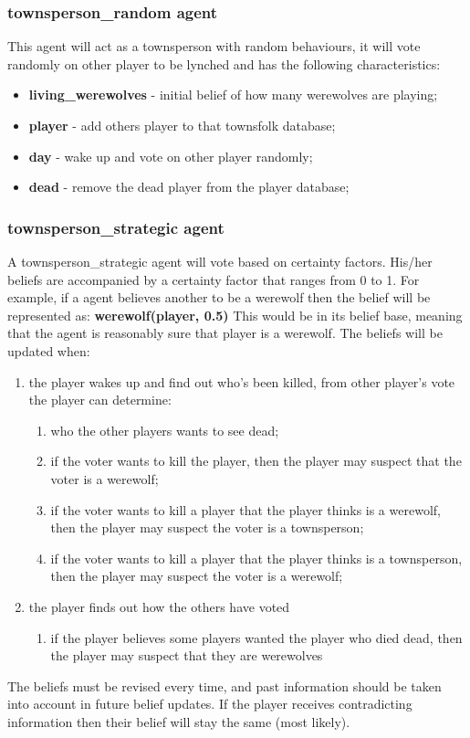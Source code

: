 \documentclass{article}
\begin{document}
\subsubsection{townsperson\_random agent}
This agent will act as a townsperson with random behaviours, it will vote randomly on other player to be lynched and has the following characteristics:
\begin{itemize}
	\item \textbf{living\_werewolves} - initial belief of how many werewolves are playing; 
	\item \textbf{player} - add others player to that townsfolk database;
	\item \textbf{day} - wake up and vote on other player randomly;
	\item \textbf{dead} - remove the dead player from the player database;
\end{itemize}

\subsubsection{townsperson\_strategic agent}
A townsperson\_strategic agent will vote based on certainty factors. 
His/her beliefs are accompanied by a certainty factor that ranges from 0 to 1. For example, if a agent believes another to be a werewolf then the belief will be represented as: 
\newline
\textbf{werewolf(player, 0.5)} 
\newline
This would be in its belief base, meaning that the agent is reasonably sure that player is a werewolf. The beliefs will be updated when:
\begin{enumerate}
	\item the player wakes up and find out who's been killed, from other player's vote the player can determine:
	\begin {enumerate}
		\item who the other players wants to see dead;
		\item if the voter wants to kill the player, then the player may suspect that the voter is a werewolf;
		\item if the voter wants to kill a player that the player thinks is a werewolf, then the player may suspect the voter is a townsperson;
		\item if the voter wants to kill a player that the player thinks is a townsperson, then the player may suspect the voter is a werewolf;
	\end{enumerate}
	\item the player finds out how the others have voted
	\begin{enumerate}
		\item if the player believes some players wanted the player who died dead, then the player may suspect that they are werewolves
	\end{enumerate}
\end{enumerate}
The beliefs must be revised every time, and past information should be taken into account in future belief updates. If the player receives contradicting information then their belief will stay the same (most likely).
\end{document}
